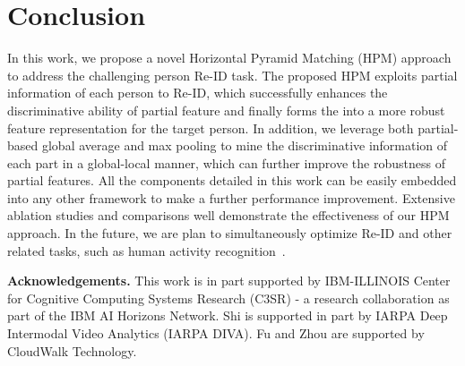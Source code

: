 \documentclass[letterpaper]{article} \usepackage{aaai19}  \usepackage{times}  \usepackage{helvet}  \usepackage{courier}  \usepackage{url}  \usepackage{graphicx}  \frenchspacing  \setlength{\pdfpagewidth}{8.5in}  \setlength{\pdfpageheight}{11in}  \usepackage{multirow}
\begin{document}
 \section{Conclusion}
In this work, we propose a novel Horizontal Pyramid Matching (HPM) approach to address the challenging person Re-ID task. The proposed HPM exploits partial information of each person to Re-ID, which successfully enhances the discriminative ability of partial feature and finally forms the into a more robust feature representation for the target person. In addition, we leverage both partial-based global average and max pooling to mine the discriminative information of each part in a global-local manner, which can further improve the robustness of partial features. All the components detailed in this work can be easily embedded into any other framework to make a further performance improvement. Extensive ablation studies and comparisons well demonstrate the effectiveness of our HPM approach. In the future, we are plan to simultaneously optimize Re-ID and other related tasks, such as human activity recognition~\cite{dai2017temporal,dai2017efficient,dai2018tan}.
 
\vspace{3mm}
\noindent
\textbf{Acknowledgements.} This work is in part supported by IBM-ILLINOIS Center for Cognitive Computing Systems Research (C3SR) - a research collaboration as part of the IBM AI Horizons Network. Shi is supported in part by IARPA Deep Intermodal Video Analytics (IARPA DIVA). Fu and Zhou are supported by CloudWalk Technology.



\end{document}
